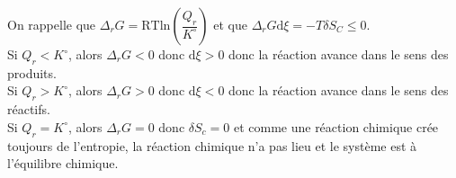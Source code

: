 \documentclass[a4paper]{article}
\begin{document}
\pagestyle{fancy}
\fancyhf{}
\setlength{\headheight}{15pt}

\begin{center}
	\large{}
\end{center}


On rappelle que \(\Delta_rG=\mathrm{RT ln}\left(\dfrac{Q_r}{K^{\circ}}\right)\) et que \(\Delta_rG\mathrm{d}\xi=-T\delta S_C\leqslant 0\).\\
Si \(Q_r< K^{\circ}\), alors \(\Delta_rG<0\) donc \(\mathrm{d}\xi>0\) donc la réaction avance dans le sens des produits.\\
Si \(Q_r> K^{\circ}\), alors \(\Delta_rG>0\) donc \(\mathrm{d}\xi<0\) donc la réaction avance dans le sens des réactifs.\\
Si \(Q_r=K^{\circ}\), alors \(\Delta_rG=0\) donc \(\delta S_c=0\) et comme une réaction chimique crée toujours de l'entropie, la réaction chimique n'a pas lieu et le système est à l'équilibre chimique.
\end{document}
